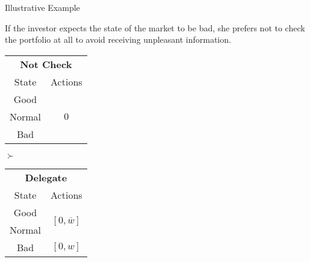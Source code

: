 \documentclass[usenames,dvipsnames,aspectratio=169,11pt, envcountsect]{beamer}
\begin{document}
\begin{frame}[noframenumbering]{Illustrative Example}

	If the investor expects the state of the market to be bad, she prefers not to check the portfolio at all to avoid receiving unpleasant information.

	\vfill

	\begin{table}[H]
		\centering
		\begin{minipage}{0.29\textwidth}
			\centering
			\begin{tabular}{c | c}
				\multicolumn{2}{c}{\textbf{Not Check}} \\
				State  & Actions                       \\
				\hline
				Good   & \multirow{3}{*}{ \( 0 \)}     \\
				Normal &                               \\
				Bad    &                               \\
			\end{tabular}
			\vspace{0.5cm} %
		\end{minipage}\hspace{0.3cm} %
		\( \succ \) %
		\begin{minipage}{0.29\textwidth}
			\centering
			\begin{tabular}{c | c}
				\multicolumn{2}{c}{\textbf{Delegate}}                                                                     \\
				State                        & Actions                                                                    \\
				\hline
				{\color{bleudefrance}Good}   & \multirow{2}{*}{{\color{bleudefrance}\( \left[0, \overline{w} \right] \)}} \\
				{\color{bleudefrance}Normal} &                                                                            \\
				Bad                          & \( \left[0, w \right]\)                                                    \\
			\end{tabular}
			\vspace{0.5cm} %
		\end{minipage}\hspace{0.3cm} %

\end{table}
\end{frame}
\end{document}
